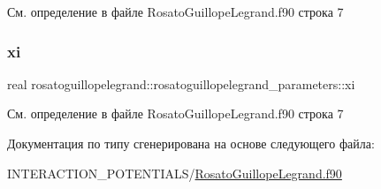 См. определение в файле Rosato\+Guillope\+Legrand.\+f90 строка 7

\mbox{\label{structrosatoguillopelegrand_1_1rosatoguillopelegrand__parameters_a4da801c40a5bb7d671781816b584aa2e}} 
\subsubsection{\texorpdfstring{xi}{xi}}
{\footnotesize\ttfamily real rosatoguillopelegrand\+::rosatoguillopelegrand\+\_\+parameters\+::xi}



См. определение в файле Rosato\+Guillope\+Legrand.\+f90 строка 7



Документация по типу сгенерирована на основе следующего файла\+:\begin{DoxyCompactItemize}
\item 
I\+N\+T\+E\+R\+A\+C\+T\+I\+O\+N\+\_\+\+P\+O\+T\+E\+N\+T\+I\+A\+L\+S/\mbox{\hyperlink{_rosato_guillope_legrand_8f90}{Rosato\+Guillope\+Legrand.\+f90}}\end{DoxyCompactItemize}
